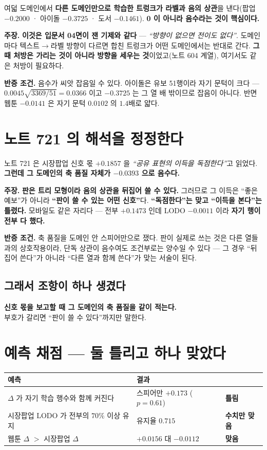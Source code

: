 \documentclass[10pt,a4paper]{article}
\newcommand{\claim}[2]{\begin{claimbox}\textbf{주장.} #1\par\smallskip
  \textcolor{gray!70}{\textbf{반증 조건.} #2}\end{claimbox}}
\begin{document}
여덟 도메인에서 \textbf{다른 도메인만으로 학습한 트렁크가 라벨과 음의 상관}을
낸다(팝업 $-0.2000$ · 아이돌 $-0.3725$ · 도서 $-0.1461$). \textbf{0 이 아니라
음수라는 것이 핵심이다.}

\claim{\textbf{이것은 입문서 04면이 잰 기제와 같다} --- \emph{``방향이 없으면
전이도 없다''}. 도메인마다 텍스트$\to$라벨 방향이 다르면 합친 트렁크가 어떤
도메인에서는 반대로 간다. \textbf{그때 처방은 가리는 것이 아니라 방향을 세우는
것}이었고(노트 604 계열), 여기서도 같은 처방이 필요하다.}
{음수가 씨앗 잡음일 수 있다. 아이돌은 유보 51행이라 자기 문턱이 크다 ---
$0.0045\sqrt{3369/51} = 0.0366$ 이고 $-0.3725$ 는 그 열 배 밖이므로 잡음이 아니다.
반면 웹툰 $-0.0141$ 은 자기 문턱 $0.0102$ 의 $1.4$배로 얇다.}

\section{노트 721 의 해석을 정정한다}

노트 721 은 시장팝업 신호 몫 $+0.1857$ 을 \emph{``공유 표현의 이득을 독점한다''}고
읽었다. \textbf{그런데 그 도메인의 축 품질 자체가 $-0.0393$ 으로 음수다.}

\claim{\textbf{판은 트리 모형이라 음의 상관을 뒤집어 쓸 수 있다.} 그러므로 그 이득은
``좋은 예보''가 아니라 \textbf{``판이 쓸 수 있는 어떤 신호''}다.
\textbf{``독점한다''는 맞고 ``이득을 본다''는 틀렸다.} 모바일도 같은 자리다 ---
전부 $+0.1473$ 인데 LODO $-0.0011$ 이라 \textbf{자기 행이 전부 다 했다.}}
{축 품질을 도메인 안 스피어만으로 쟀다. 판이 실제로 쓰는 것은 다른 열들과의
상호작용이라, 단독 상관이 음수여도 조건부로는 양수일 수 있다 --- 그 경우 ``뒤집어
쓴다''가 아니라 ``다른 열과 함께 쓴다''가 맞는 서술이 된다.}

\subsection*{그래서 조항이 하나 생겼다}

\begin{center}
\textbf{신호 몫을 보고할 때 그 도메인의 축 품질을 같이 적는다.}\\
부호가 갈리면 ``판이 쓸 수 있다''까지만 말한다.
\end{center}

\section{예측 채점 --- 둘 틀리고 하나 맞았다}

\begin{center}
\begin{tabular}{lll}
\toprule
예측 & 결과 & \\
\midrule
$\Delta$ 가 자기 학습 행수와 함께 커진다 & 스피어만 $+0.173$ ($p{=}0.61$) & \textbf{틀림} \\
시장팝업 LODO 가 전부의 $70\%$ 이상 유지 & 유지율 $0.715$ & \textbf{수치만 맞음} \\
웹툰 $\Delta$ $>$ 시장팝업 $\Delta$ & $+0.0156$ 대 $-0.0112$ & \textbf{맞음} \\
\bottomrule
\end{tabular}
\end{center}
\end{document}
